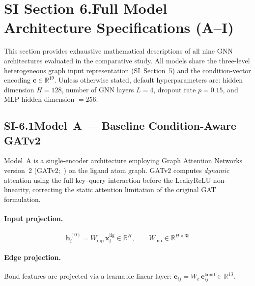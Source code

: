 \documentclass[11pt]{article}
\begin{document}
\label{si:graph_end}

\section*{SI Section 6.\quad Full Model Architecture Specifications (A--I)}
\label{si:models}

This section provides exhaustive mathematical descriptions of all nine
GNN architectures evaluated in the comparative study.
All models share the three-level heterogeneous graph input representation
(SI~Section~5) and the condition-vector encoding
$\mathbf{c} \in \mathbb{R}^{19}$.
Unless otherwise stated, default hyperparameters are:
hidden dimension $H = 128$, number of GNN layers $L = 4$,
dropout rate $p = 0.15$, and MLP hidden dimension $= 256$.

\subsection*{SI-6.1\quad Model~A --- Baseline Condition-Aware GATv2}
\label{si:model_a}

Model~A is a single-encoder architecture employing Graph Attention
Networks version~2 (GATv2;~\cite{brody2022how}) on the ligand atom graph.
GATv2 computes \emph{dynamic} attention using the full key--query
interaction before the LeakyReLU non-linearity, correcting the static
attention limitation of the original GAT formulation.

\paragraph{Input projection.}
$$\mathbf{h}_i^{(0)} = W_{\mathrm{inp}} \, \mathbf{x}_i^{\mathrm{lig}}
  \in \mathbb{R}^{H}, \qquad
  W_{\mathrm{inp}} \in \mathbb{R}^{H \times 35}$$

\paragraph{Edge projection.}
Bond features are projected via a learnable linear layer:
$\tilde{\mathbf{e}}_{ij} = W_e\,\mathbf{e}_{ij}^{\mathrm{bond}}
\in \mathbb{R}^{13}$.
\end{document}
